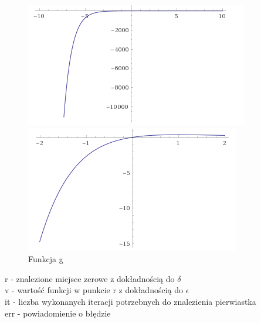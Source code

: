 \documentclass[11pt, a4paper]{article}
\begin{document}
    \begin{figure}[H]
        \caption{Funkcja g}
        \begin{minipage}{0.4\textwidth}
            \centering
            \includegraphics[width=\linewidth]{gminus10to10}
        \end{minipage}
        \begin{minipage}{0.4\textwidth}
            \centering
            \includegraphics[width=\linewidth]{gminus2to2}
        \end{minipage}
    \end{figure}

    r - znalezione miejsce zerowe z dokładnością do $\delta$ \\
    v - wartość funkcji w punkcie r z dokładnością do $\epsilon$ \\
    it - liczba wykonanych iteracji potrzebnych do znalezienia pierwiastka \\
    err - powiadomienie o błędzie
\end{document}
